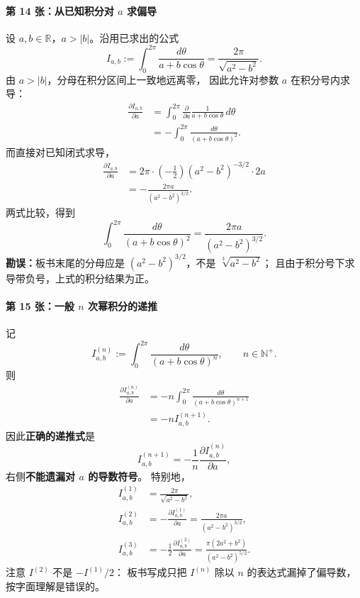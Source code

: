 \paragraph{第 14 张：从已知积分对 $a$ 求偏导}
设 $a,b\in\mathbb R$，$a>|b|$。沿用已求出的公式
\[
  I_{a,b}:=\int_0^{2\pi}\frac{d\theta}{a+b\cos\theta}
    =\frac{2\pi}{\sqrt{a^2-b^2}}.
\]
由 $a>|b|$，分母在积分区间上一致地远离零，
因此允许对参数 $a$ 在积分号内求导：
\begin{align*}
  \frac{\partial I_{a,b}}{\partial a}
  &=\int_0^{2\pi}\frac{\partial}{\partial a}
       \frac{1}{a+b\cos\theta}\,d\theta\\
  &=-\int_0^{2\pi}
       \frac{d\theta}{(a+b\cos\theta)^2}.
\end{align*}
而直接对已知闭式求导，
\begin{align*}
  \frac{\partial I_{a,b}}{\partial a}
  &=2\pi\cdot\left(-\frac12\right)
         (a^2-b^2)^{-3/2}\cdot2a\\
  &=-\frac{2\pi a}{(a^2-b^2)^{3/2}}.
\end{align*}
两式比较，得到
\[
  \boxed{
  \int_0^{2\pi}
      \frac{d\theta}{(a+b\cos\theta)^2}
    =\frac{2\pi a}{(a^2-b^2)^{3/2}}.}
\]
\textbf{勘误：}板书末尾的分母应是
$(a^2-b^2)^{3/2}$，不是 $\sqrt[3]{a^2-b^2}$；
且由于积分号下求导带负号，上式的积分结果为正。

\paragraph{第 15 张：一般 $n$ 次幂积分的递推}
记
\[
  I_{a,b}^{(n)}
  :=\int_0^{2\pi}
       \frac{d\theta}{(a+b\cos\theta)^n},
  \qquad n\in\mathbb N^+.
\]
则
\begin{align*}
  \frac{\partial I_{a,b}^{(n)}}{\partial a}
    &=-n\int_0^{2\pi}
       \frac{d\theta}{(a+b\cos\theta)^{n+1}}\\
    &=-n I_{a,b}^{(n+1)}.
\end{align*}
因此\textbf{正确的递推式}是
\[
  \boxed{
  I_{a,b}^{(n+1)}
    =-\frac1n\frac{\partial I_{a,b}^{(n)}}{\partial a},
  }
\]
右侧\textbf{不能遗漏对 $a$ 的导数符号}。
特别地，
\begin{align*}
  I_{a,b}^{(1)}
    &=\frac{2\pi}{\sqrt{a^2-b^2}},\\
  I_{a,b}^{(2)}
    &=-\frac{\partial I_{a,b}^{(1)}}{\partial a}
     =\frac{2\pi a}{(a^2-b^2)^{3/2}},\\
  I_{a,b}^{(3)}
    &=-\frac12\frac{\partial I_{a,b}^{(2)}}{\partial a}
     =\frac{\pi(2a^2+b^2)}{(a^2-b^2)^{5/2}}.
\end{align*}
注意 $I^{(2)}$ 不是 $-I^{(1)}/2$：
板书写成只把 $I^{(n)}$ 除以 $n$
的表达式漏掉了偏导数，按字面理解是错误的。

